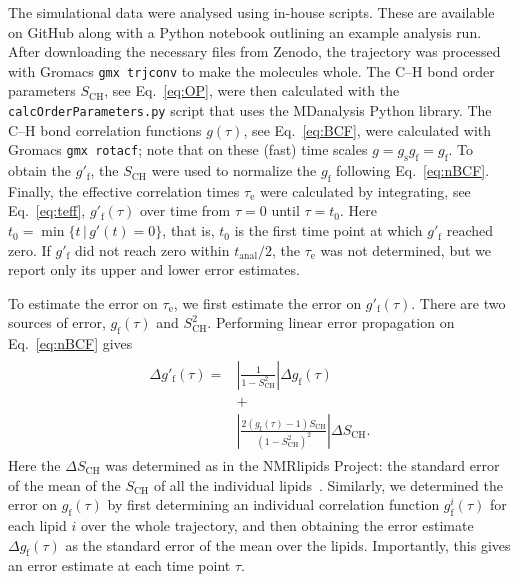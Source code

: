 \documentclass[journal=jpcbfk,manuscript=article,layout=twocolumn]{achemso}
\begin{document}
The simulational data were analysed using in-house scripts. These are available on GitHub \cite{citehere} along with a Python notebook outlining an example analysis run.
After downloading the necessary files from Zenodo, the trajectory was processed with Gromacs \texttt{gmx trjconv} to make the molecules whole.
The C--H bond order parameters  $S_\mathrm{CH}$, see Eq.~\eqref{eq:OP}, were then calculated with the \texttt{calcOrderParameters.py}\cite{citegithubhere} script that uses the MDanalysis\cite{XXX} Python library.
%
The \mbox{C--H} bond correlation functions
$g(\tau)$, see Eq.~\eqref{eq:BCF},
were calculated with Gromacs\cite{XXX} \texttt{gmx rotacf};
note that on these (fast) time scales $g = g_\mathrm{s} g_\mathrm{f}= g_\mathrm{f}$.
%
To obtain the $g'_\mathrm f$,
the $S_\mathrm{CH}$ were used to
normalize the $g_\mathrm f$ following Eq.~\eqref{eq:nBCF}.
%
Finally, the effective correlation times $\tau_\mathrm e$ were calculated by integrating, see Eq.~\eqref{eq:teff},
$g'_\mathrm f(\tau)$ over time from $\tau=0$ until $\tau = t_0$.
Here
$t_0 = \min
	\{
	t\,|\,g'(t)=0
	\}
$,
that is, $t_\mathrm 0$ is the first time point at which $g'_\mathrm f$ reached zero.
%
If $g'_\mathrm f$ did not reach zero within 
$t_\mathrm{anal}/2$, the 
$\tau_\mathrm e$ was not determined,
but we report only its upper and lower error estimates.

To estimate the error on $\tau_\mathrm e$, we first estimate the error on $g'_\mathrm f(\tau)$.
%
There are two sources of error, $g_{\mathrm{f}}(\tau)$ and $S^2_\mathrm{CH}$.
%
Performing linear error propagation on Eq.~\eqref{eq:nBCF} gives
\begin{align}
\begin{split}
\label{eq:error}
\Delta g'_{\mathrm{f}}(\tau)
=
&\left|
	\frac{1}{1-S^2_\mathrm{CH}}
\right|
\Delta g_{\mathrm{f}}(\tau)\\
&+\\
&\left|
	\frac{2\left(g_\mathrm{f}(\tau)-1\right)S_\mathrm{CH}}{\left(1-S^2_\mathrm{CH}\right)^2}
\right|
\Delta S_\mathrm{CH}.
\end{split}
\end{align}
Here the $\Delta S_\mathrm{CH}$ was determined as in the NMR\-lipids Project:
the standard error of the mean of the $S_\mathrm{CH}$ of all the individual lipids~\cite{botan15}.
%
Similarly, we determined the error on $g_{\mathrm{f}}(\tau)$
by first determining an individual correlation function $g^i_{\mathrm{f}}(\tau)$ for each lipid $i$
over the whole trajectory, and then obtaining the error estimate
$\Delta g_{\mathrm{f}}(\tau)$
as the standard error of the mean over the lipids.
%
Importantly, this gives an error estimate at each time point $\tau$.
\end{document}
